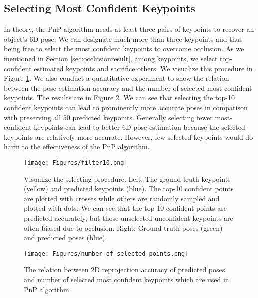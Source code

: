 \documentclass[10pt,twocolumn,letterpaper]{article}
\begin{document}
\subsection{Selecting Most Confident Keypoints}
\label{sec:choosing_most_conf}
In theory, the PnP algorithm needs at least three pairs of keypoints to recover an object's 6D pose. We can designate much more than three keypoints and thus being free to select the most confident keypoints to overcome occlusion. As we mentioned in Section \ref{sec:occlusionresult}, among  keypoints, we select top- confident estimated keypoints and sacrifice others. We visualize this procedure in Figure \ref{fig:filter10}. We also conduct a quantitative experiment to show the relation between the pose estimation accuracy and the number of selected most confident keypoints. The results are in Figure \ref{fig:number_of_selected_keypoints}. We can see that selecting the top-10 confident keypoints can lead to prominently more accurate poses in comparison with preserving all 50 predicted keypoints. Generally selecting fewer most-confident keypoints can lead to better 6D pose estimation because the selected keypoints are relatively more accurate. However, few selected keypoints would do harm to the effectiveness of the PnP algorithm.
\begin{figure}[t]
\begin{center}
   \texttt{[image: Figures/filter10.png]}
\end{center}
   \caption{Visualize the selecting procedure. Left: The ground truth keypoints (yellow) and predicted keypoints (blue). The top-10 confident points are plotted with crosses while others are randomly sampled and plotted with dots. We can see that the top-10 confident points are predicted accurately, but those unselected unconfident keypoints are often biased due to occlusion. Right: Ground truth poses (green) and predicted poses (blue).}
\label{fig:filter10}
\end{figure}

\begin{figure}[t]
\begin{center}
   \texttt{[image: Figures/number\_of\_selected\_points.png]}
\end{center}
   \caption{The relation between 2D reprojection accuracy of predicted poses and number of selected most confident keypoints which are used in PnP algorithm.}
\label{fig:number_of_selected_keypoints}
\end{figure}
\end{document}
